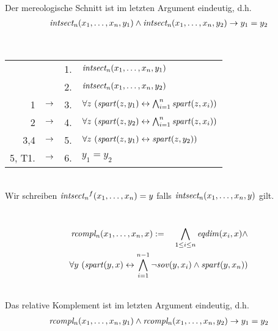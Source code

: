 \begin{satz}\ \\
    Der mereologische Schnitt ist im letzten Argument eindeutig, d.h.
    \begin{align*}
        \mathit{intsect_{n}}(x_{1},\ldots,x_{n},y_1) \land \mathit{intsect_{n}}(x_{1},\ldots,x_{n},y_2) \to y_1 = y_2
    \end{align*}
\end{satz}

\begin{bew}\ \\
    \begin{longtable}{r c c l}
        & & 1. & $\mathit{intsect_{n}}(x_{1},\ldots,x_{n},y_1)$\\
        & & 2. & $\mathit{intsect_{n}}(x_{1},\ldots,x_{n},y_2)$\\
        1 & $\rightarrow$ & 3. & $\forall z\ (\Gspart(z,y_1) \leftrightarrow \bigwedge^{n}_{i=1} \Gspart(z,x_{i}))$\\
        2 & $\rightarrow$ & 4. & $\forall z\ (\Gspart(z,y_2) \leftrightarrow \bigwedge^{n}_{i=1} \Gspart(z,x_{i}))$ \\
        3,4 & $\rightarrow$ & 5. & $\forall z\ (\Gspart(z,y_1) \leftrightarrow \Gspart(z,y_2))$ \\
        5, T1. & $\rightarrow$ & 6. & $y_1 = y_2$
    \end{longtable}
\end{bew}

\begin{konv}\ \\
    Wir schreiben $\mathit{intsect_{n}}^f(x_{1},\ldots,x_{n}) = y$ falls $\mathit{intsect_{n}}(x_{1},\ldots,x_{n},y)$ gilt.
\end{konv}


\begin{erin}\ \\
    \begin{align*}
        \mathit{rcompl_{n}}(x_{1},\ldots,x_{n},x) := \hspace*{1em}\bigwedge_{1\leq i \leq n} \mathit{eqdim}(x_i, x) \wedge\\
        \forall y\ (\mathit{spart}(y,x)
        \leftrightarrow \bigwedge^{n-1}_{i=1} \neg\mathit{sov}(y,x_{i}) \wedge \mathit{spart}(y, x_{n}))
    \end{align*}
\end{erin}

\begin{satz}\ \\
    Das relative Komplement ist im letzten Argument eindeutig, d.h.
    \begin{align*}
        \mathit{rcompl_{n}}(x_{1},\ldots,x_{n},y_1) \land \mathit{rcompl_{n}}(x_{1},\ldots,x_{n},y_2) \to y_1 = y_2
    \end{align*}
\end{satz}

